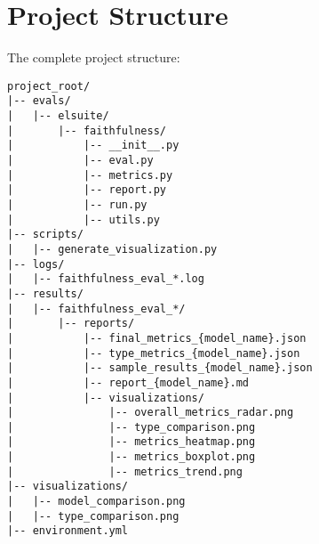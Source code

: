 \section{Project Structure}
The complete project structure:

\begin{lstlisting}[language=Text, breaklines=true, basicstyle=\ttfamily\scriptsize]
project_root/
|-- evals/
|   |-- elsuite/
|       |-- faithfulness/
|           |-- __init__.py
|           |-- eval.py
|           |-- metrics.py
|           |-- report.py
|           |-- run.py
|           |-- utils.py
|-- scripts/
|   |-- generate_visualization.py
|-- logs/
|   |-- faithfulness_eval_*.log
|-- results/
|   |-- faithfulness_eval_*/
|       |-- reports/
|           |-- final_metrics_{model_name}.json
|           |-- type_metrics_{model_name}.json
|           |-- sample_results_{model_name}.json
|           |-- report_{model_name}.md
|           |-- visualizations/
|               |-- overall_metrics_radar.png
|               |-- type_comparison.png
|               |-- metrics_heatmap.png
|               |-- metrics_boxplot.png
|               |-- metrics_trend.png
|-- visualizations/
|   |-- model_comparison.png
|   |-- type_comparison.png
|-- environment.yml
\end{lstlisting}
